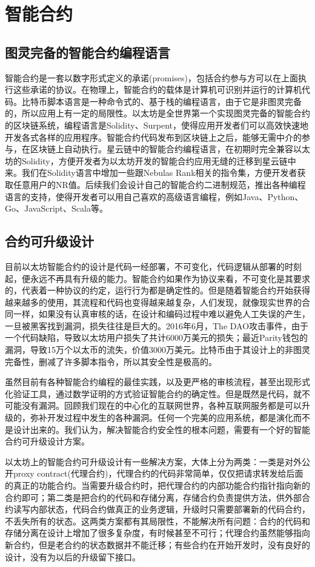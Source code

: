 \section{智能合约}

\subsection{图灵完备的智能合约编程语言}
智能合约是一套以数字形式定义的承诺(promises)，包括合约参与方可以在上面执行这些承诺的协议。在物理上，智能合约的载体是计算机可识别并运行的计算机代码。比特币脚本语言是一种命令式的、基于栈的编程语言，由于它是非图灵完备的，所以应用上有一定的局限性。以太坊是全世界第一个实现图灵完备的智能合约的区块链系统，编程语言是Solidity、Surpent，使得应用开发者们可以高效快速地开发各式各样的应用程序。智能合约代码发布到区块链上之后，能够无需中介的参与，在区块链上自动执行。星云链中的智能合约编程语言，在初期时完全兼容以太坊的Solidity，方便开发者为以太坊开发的智能合约应用无缝的迁移到星云链中来。我们在Solidity语言中增加一些跟Nebulas Rank相关的指令集，方便开发者获取任意用户的NR值。后续我们会设计自己的智能合约二进制规范，推出各种编程语言的支持，使得开发者可以用自己喜欢的高级语言编程，例如Java、Python、Go、JavaScript、Scala等。

\subsection{合约可升级设计}
目前以太坊智能合约的设计是代码一经部署，不可变化，代码逻辑从部署的时刻起，便永远不再具有升级的能力。智能合约如果作为协议来看，不可变化是其要求的，代表着一种协议的约定，运行行为都是确定性的。但是随着智能合约开始获得越来越多的使用，其流程和代码也变得越来越复杂，人们发现，就像现实世界的合同一样，如果没有认真审核的话，在设计和编码过程中难以避免人工失误的产生，一旦被黑客找到漏洞，损失往往是巨大的。2016年6月，The DAO攻击事件，由于一个代码缺陷，导致以太坊用户损失了共计6000万美元的损失；最近Parity钱包的漏洞，导致15万个以太币的流失，价值3000万美元。比特币由于其设计上的非图灵完备性，删减了许多脚本指令，所以其安全性是极高的。

虽然目前有各种智能合约编程的最佳实践，以及更严格的审核流程，甚至出现形式化验证工具，通过数学证明的方式验证智能合约的确定性。但是既然是代码，就不可能没有漏洞。回顾我们现在的中心化的互联网世界，各种互联网服务都是可以升级的，弥补开发过程中发生的各种漏洞。任何一个完美的应用系统，都是演化而不是设计出来的。我们认为，解决智能合约安全性的根本问题，需要有一个好的智能合约可升级设计方案。

以太坊上的智能合约可升级设计有一些解决方案，大体上分为两类：一类是对外公开proxy contract(代理合约)，代理合约的代码非常简单，仅仅把请求转发给后面的真正的功能合约。当需要升级合约时，把代理合约的内部功能合约指针指向新的合约即可；第二类是把合约的代码和存储分离，存储合约负责提供方法，供外部合约读写内部状态，代码合约做真正的业务逻辑，升级时只需要部署新的代码合约，不丢失所有的状态。这两类方案都有其局限性，不能解决所有问题：合约的代码和存储分离在设计上增加了很多复杂度，有时候甚至不可行；代理合约虽然能够指向新合约，但是老合约的状态数据并不能迁移；有些合约在开始开发时，没有良好的设计，没有为以后的升级留下接口。


